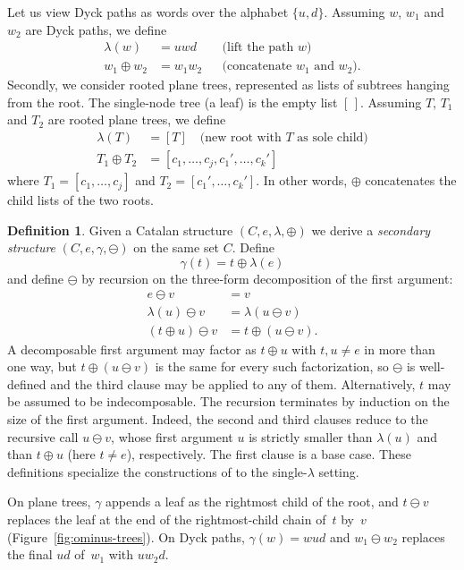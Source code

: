 \documentclass[a4paper,11pt]{article}
\theoremstyle{definition}
\newtheorem{definition}[theorem]{Definition}
\begin{document}
Let us view Dyck paths as words over the alphabet $\{u,d\}$.
Assuming $w$, $w_1$ and $w_2$ are Dyck paths, we define
\begin{align*}
  \lambda(w) &= uwd &&\text{(lift the path $w$)} \\
  w_1 \oplus w_2 &= w_1 w_2 &&\text{(concatenate $w_1$ and $w_2$)}.
\end{align*}
Secondly, we consider rooted plane trees, represented as lists of
subtrees hanging from the root. The single-node tree (a leaf)
is the empty list $[\,]$. Assuming $T$, $T_1$ and $T_2$ are
rooted plane trees, we define
\begin{align*}
  \lambda(T) &= [T]
    \quad\text{(new root with } T
    \text{ as sole child)} \\
  T_1 \oplus T_2 &= [c_1, \ldots, c_j,
    c_1', \ldots, c_k']
\end{align*}
where $T_1 = [c_1, \ldots, c_j]$ and
$T_2 = [c_1', \ldots, c_k']$.  In other words, $\oplus$ concatenates the child lists
of the two roots.

\begin{definition}\label{def:secondary}\label{sec:secondary}
Given a Catalan structure $(C,e,\lambda,\oplus)$ we derive
a \emph{secondary structure} $(C,e,\gamma,\ominus)$ on the
same set $C$. Define
\[
  \gamma(t) = t \oplus \lambda(e)
\]
and define $\ominus$ by recursion on the three-form
decomposition of the first argument:
\begin{align*}
       e \ominus v &= v \\
    \lambda(u) \ominus v &= \lambda(u \ominus v) \\
 (t \oplus u) \ominus v &= t \oplus (u \ominus v).
\end{align*}
A decomposable first argument may factor as $t \oplus u$ with $t, u \neq e$ in
more than one way, but $t \oplus (u \ominus v)$ is the same for every such
factorization, so $\ominus$ is well-defined and the third clause may be applied
to any of them. Alternatively, $t$ may be assumed to be indecomposable.
The recursion terminates by induction on the size of the first argument. Indeed, the
second and third clauses reduce to the recursive call $u \ominus v$, whose first
argument $u$ is strictly smaller than $\lambda(u)$ and than $t \oplus u$ (here
$t \neq e$), respectively. The first clause is a base case.
These definitions specialize the constructions of
\cite{CKS09} to the single-$\lambda$ setting.
\end{definition}

On plane trees, $\gamma$ appends a leaf as the
rightmost child of the root, and $t \ominus v$
replaces the leaf at the end of the rightmost-child
chain of~$t$ by~$v$ (Figure~\ref{fig:ominus-trees}).
On Dyck paths, $\gamma(w) = wud$ and
$w_1 \ominus w_2$ replaces the final $ud$ of~$w_1$
with $u w_2 d$.
\end{document}
